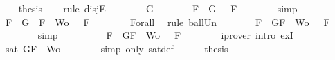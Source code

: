 \begin{isabellebody}
\ \ \isamarkupfalse%
\ {\isacharquery}thesis\isanewline
\ \ \isamarkupfalse%
\ {\isacharparenleft}rule\ disjE{\isacharparenright}\isanewline
\ \ \ \ \isamarkupfalse%
\ {\isachardoublequoteopen}{\isasymA}\ {\isasymTurnstile}\ G{\isachardoublequoteclose}\isanewline
\ \ \ \ \isamarkupfalse%
\ \isamarkupfalse%
\ {\isachardoublequoteopen}{\isasymforall}F\ {\isasymin}\ {\isacharbraceleft}G{\isacharbraceright}{\isachardot}\ {\isasymA}\ {\isasymTurnstile}\ F{\isachardoublequoteclose}\isanewline
\ \ \ \ \ \ \isamarkupfalse%
\ simp\isanewline
\ \ \ \ \isamarkupfalse%
\ \isamarkupfalse%
\ {\isachardoublequoteopen}{\isasymforall}F\ {\isasymin}\ {\isacharparenleft}{\isacharbraceleft}G{\isacharbraceright}\ {\isasymunion}\ {\isacharparenleft}{\isacharbraceleft}F{\isacharbraceright}\ {\isasymunion}\ Wo{\isacharparenright}{\isacharparenright}{\isachardot}\ {\isasymA}\ {\isasymTurnstile}\ F{\isachardoublequoteclose}\isanewline
\ \ \ \ \ \ \isamarkupfalse%
\ Forall{}\ \isamarkupfalse%
\ {\isacharparenleft}rule\ ball{\isacharunderscore}Un{\isacharparenright}\isanewline
\ \ \ \ \isamarkupfalse%
\ \isamarkupfalse%
\ {\isachardoublequoteopen}{\isasymforall}F\ {\isasymin}\ {\isacharbraceleft}G{\isacharcomma}F{\isacharbraceright}\ {\isasymunion}\ Wo{\isachardot}\ {\isasymA}\ {\isasymTurnstile}\ F{\isachardoublequoteclose}\isanewline
\ \ \ \ \ \ \isamarkupfalse%
\ simp\ \isanewline
\ \ \ \ \isamarkupfalse%
\ \isamarkupfalse%
\ {\isachardoublequoteopen}{\isasymexists}{\isasymA}{\isachardot}\ {\isasymforall}F\ {\isasymin}\ {\isacharparenleft}{\isacharbraceleft}G{\isacharcomma}F{\isacharbraceright}\ {\isasymunion}\ Wo{\isacharparenright}{\isachardot}\ {\isasymA}\ {\isasymTurnstile}\ F{\isachardoublequoteclose}\isanewline
\ \ \ \ \ \ \isamarkupfalse%
\ {\isacharparenleft}iprover\ intro{\isacharcolon}\ exI{\isacharparenright}\isanewline
\ \ \ \ \isamarkupfalse%
\ \isamarkupfalse%
\ {\isachardoublequoteopen}sat\ {\isacharparenleft}{\isacharbraceleft}G{\isacharcomma}F{\isacharbraceright}\ {\isasymunion}\ Wo{\isacharparenright}{\isachardoublequoteclose}\isanewline
\ \ \ \ \ \ \isamarkupfalse%
\ {\isacharparenleft}simp\ only{\isacharcolon}\ sat{\isacharunderscore}def{\isacharparenright}\isanewline
\ \ \ \ \isamarkupfalse%
\ {\isacharquery}thesis\isanewline

\end{isabellebody}
